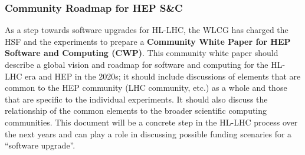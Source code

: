 \begin{frame}
\frametitle{Community Roadmap for HEP S\&C}

\noindent As a step towards software upgrades for HL-LHC, the WLCG has charged the HSF and the experiments to prepare a {\bf Community White Paper for HEP Software and Computing (CWP)}.  This community white paper should describe a global
vision and roadmap for software and computing for the HL-LHC era and HEP in the 2020s;
it should include discussions of elements that are common to
the HEP community (LHC community, etc.) as a whole and those that are specific
to the individual experiments. It should also discuss the relationship of the 
common elements to the broader scientific computing communities.
\vskip 0.15in
This document will be a concrete step in the HL-LHC process over the next years and can play a role in discussing possible funding scenaries for a ``software upgrade''.

\end{frame}


